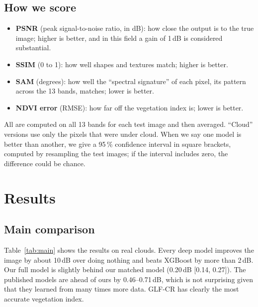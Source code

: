 \documentclass[conference]{IEEEtran}
\begin{document}
\subsection{How we score}
\begin{itemize}
\item \textbf{PSNR} (peak signal-to-noise ratio, in dB): how close the output is to the true
image; higher is better, and in this field a gain of 1\,dB is considered substantial.
\item \textbf{SSIM} (0 to 1): how well shapes and textures match; higher is better.
\item \textbf{SAM} (degrees): how well the ``spectral signature'' of each pixel, its pattern across
the 13 bands, matches; lower is better.
\item \textbf{NDVI error} (RMSE): how far off the vegetation index is; lower is better.
\end{itemize}
All are computed on all 13 bands for each test image and then averaged. ``Cloud'' versions use
only the pixels that were under cloud. When we say one model is better than another, we give a
95\,\% confidence interval in square brackets, computed by resampling the test images; if the
interval includes zero, the difference could be chance.

\section{Results}

\subsection{Main comparison}
Table~\ref{tab:main} shows the results on real clouds. Every deep model improves the image by
about 10\,dB over doing nothing and beats XGBoost by more than 2\,dB. Our full model is slightly
behind our matched model (0.20\,dB [0.14, 0.27]). The published models are ahead of ours by
0.46--0.71\,dB, which is not surprising given that they learned from many times more data. GLF-CR
has clearly the most accurate vegetation index.
\end{document}
